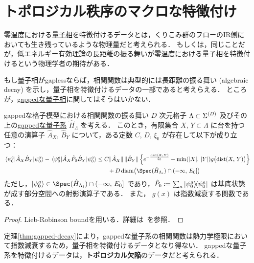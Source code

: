 \documentclass[TQFT_main]{subfiles}
\begin{document}
\section{トポロジカル秩序のマクロな特徴付け}

零温度における\hyperref[def:quantum-phase]{量子相}を特徴付けるデータとは，くりこみ群のフローのIR側においても生き残っているような物理量だと考えられる．
もしくは，同じことだが，低エネルギー有効理論の長距離の振る舞いが零温度における量子相を特徴付けるという物理学者の期待がある．

もし量子相がgaplessならば，相関関数は典型的には長距離の振る舞い (algebraic decay) を示し，量子相を特徴付けるデータの一部であると考えらえる．
ところが，\hyperref[def:quantum-phase]{gappedな量子相}に関してはそうはいかない．

\begin{mytheo}[label=thm:gapped-decay]{gappedな格子模型における相関関数の振る舞い}
    $D$ 次元格子 $\Lambda \subset \Sigma^{(D)}$ 及びその上の\hyperref[def:gapped]{gappedな量子系} $\hat{H}_\Lambda$ を考える．
    このとき，有限集合 $X,\, Y \subset \Lambda$ に台を持つ任意の演算子 $\hat{A}_X,\, \hat{B}_Y$ について，ある定数 $C,\, D,\, \xi_0$ が存在して以下が成り立つ：
    \begin{align}
        \mel{\psi_0^a}{\hat{A}_X \hat{B}_Y}{\psi_0^a} - \mel{\psi_0^a}{\hat{A}_X \hat{P}_0 \hat{B}_Y}{\psi_0^a} 
        &\le C  \norm*{\hat{A}_X} \norm*{\hat{B}_Y} \Bigl\{ e^{- \frac{\mathrm{dist} (X,\, Y)}{\xi_0}} + \min (\abs{X},\, \abs{Y}) g \bigl(\mathrm{dist} (X,\, Y) \bigr) \Bigr\} \\
        &\qquad + D\, \mathrm{diam}\bigl(\Spec (\hat{H}_{\Lambda_i}) \cap (-\infty,\, E_0] \bigr)
    \end{align}
    ただし，$\ket{\psi_0^a} \in \Spec (\hat{H}_{\Lambda_i}) \cap (-\infty,\, E_0]$ であり，$\hat{P}_0 \coloneqq \sum_a \ketbra{\psi_0^a}{\psi_0^a}$ は基底状態が成す部分空間への射影演算子である．
    また， $g(x)$ は指数減衰する関数である．
\end{mytheo}

\begin{proof}
    Lieb-Robinson boundを用いる．詳細は~\cite[Theorem 2, p.7]{Hastings2010localityquantumsystems}を参照．
\end{proof}

定理\ref{thm:gapped-decay}により，gappedな量子系の相関関数は熱力学極限において指数減衰するため，量子相を特徴付けるデータとなり得ない．
gappedな量子系を特徴付けるデータは，\textbf{トポロジカル欠陥}のデータだと考えられる．
\end{document}
